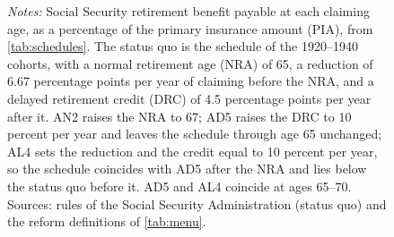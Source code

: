 \begin{figure}[!t]
\begin{minipage}{0.92\textwidth}
\vspace{4pt}
\scriptsize
\textit{Notes:} Social Security retirement benefit payable at each claiming age, as a percentage of the primary insurance amount (PIA), from \autoref{tab:schedules}. The status quo is the schedule of the 1920--1940 cohorts, with a normal retirement age (NRA) of 65, a reduction of 6.67 percentage points per year of claiming before the NRA, and a delayed retirement credit (DRC) of 4.5 percentage points per year after it. AN2 raises the NRA to 67; AD5 raises the DRC to 10 percent per year and leaves the schedule through age 65 unchanged; AL4 sets the reduction and the credit equal to 10 percent per year, so the schedule coincides with AD5 after the NRA and lies below the status quo before it. AD5 and AL4 coincide at ages 65--70. Sources: rules of the Social Security Administration (status quo) and the reform definitions of \autoref{tab:menu}.
\end{minipage}
\end{figure}
